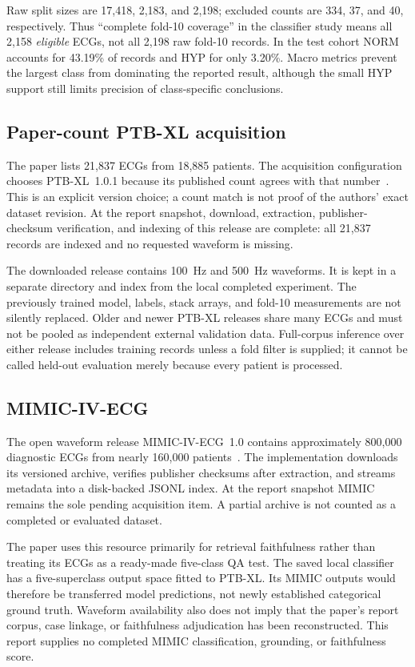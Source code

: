 \documentclass[11pt,a4paper]{article}
\begin{document}
Raw split sizes are 17,418, 2,183, and 2,198; excluded counts are 334, 37, and 40, respectively. Thus ``complete fold-10 coverage'' in the classifier study means all 2,158 \emph{eligible} ECGs, not all 2,198 raw fold-10 records. In the test cohort NORM accounts for 43.19\% of records and HYP for only 3.20\%. Macro metrics prevent the largest class from dominating the reported result, although the small HYP support still limits precision of class-specific conclusions.

\subsection{Paper-count PTB-XL acquisition}
The paper lists 21,837 ECGs from 18,885 patients. The acquisition configuration chooses PTB-XL~1.0.1 because its published count agrees with that number~\cite{ptbxl_old}. This is an explicit version choice; a count match is not proof of the authors' exact dataset revision. At the report snapshot, download, extraction, publisher-checksum verification, and indexing of this release are complete: all 21,837 records are indexed and no requested waveform is missing.

The downloaded release contains 100~Hz and 500~Hz waveforms. It is kept in a separate directory and index from the local completed experiment. The previously trained model, labels, stack arrays, and fold-10 measurements are not silently replaced. Older and newer PTB-XL releases share many ECGs and must not be pooled as independent external validation data. Full-corpus inference over either release includes training records unless a fold filter is supplied; it cannot be called held-out evaluation merely because every patient is processed.

\subsection{MIMIC-IV-ECG}
The open waveform release MIMIC-IV-ECG~1.0 contains approximately 800,000 diagnostic ECGs from nearly 160,000 patients~\cite{mimic}. The implementation downloads its versioned archive, verifies publisher checksums after extraction, and streams metadata into a disk-backed JSONL index. At the report snapshot MIMIC remains the sole pending acquisition item. A partial archive is not counted as a completed or evaluated dataset.

The paper uses this resource primarily for retrieval faithfulness rather than treating its ECGs as a ready-made five-class QA test. The saved local classifier has a five-superclass output space fitted to PTB-XL. Its MIMIC outputs would therefore be transferred model predictions, not newly established categorical ground truth. Waveform availability also does not imply that the paper's report corpus, case linkage, or faithfulness adjudication has been reconstructed. This report supplies no completed MIMIC classification, grounding, or faithfulness score.
\end{document}
